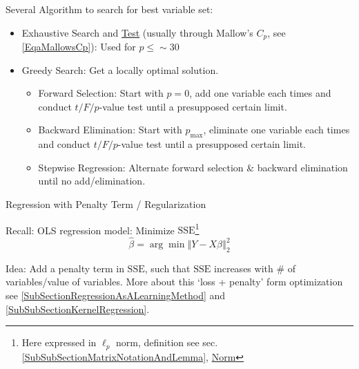     Several Algorithm to search for best variable set:
\begin{itemize}[topsep=2pt,itemsep=0pt]
\item Exhaustive Search and \hyperlink{ModelValidationCriteria}{Test} (usually through Mallow's $ C_p $, see \autoref{EqaMallowsCp}): Used for $ p\leq \sim 30 $
\item Greedy Search: Get a locally optimal solution.
\begin{itemize}[topsep=2pt,itemsep=2pt]
    \item Forward Selection: Start with $ p=0 $, add one variable each times and conduct $ t/F/p $-value test until a presupposed certain limit.
    \item Backward Elimination: Start with $ p_\mathrm{max} $, eliminate one variable each times and conduct $ t/F/p $-value test until a presupposed certain limit.
    \item Stepwise Regression: Alternate forward selection \& backward elimination until no add/elimination.
\end{itemize}
\end{itemize}


\begin{point}
    Regression with Penalty Term / Regularization
\end{point}

Recall: OLS regression model: Minimize $ \mathrm{SSE}  $\footnote{Here expressed in $ \ell_p  $ norm, definition see sec.\ref{SubSubSectionMatrixNotationAndLemma}, \hyperlink{NormDefinition}{Norm}}
\begin{equation}
    \hat{\beta }=\arg\min \left\Vert Y-X\beta \right\Vert _2 ^2
\end{equation}

Idea: Add a penalty term in $ \mathrm{SSE} $, such that $ \mathrm{SSE} $ increases with \# of variables/value of variables. More about this `loss + penalty' form optimization see \autoref{SubSectionRegressionAsALearningMethod} and \autoref{SubSubSectionKernelRegression}.



